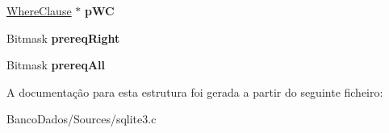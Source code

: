 \begin{DoxyCompactItemize}
\item 
\hypertarget{struct_where_term_a1fb0a9ede5a12d6d2f7886431b348fb3}{\hyperlink{struct_where_clause}{Where\-Clause} $\ast$ {\bfseries p\-W\-C}}\label{struct_where_term_a1fb0a9ede5a12d6d2f7886431b348fb3}

\item 
\hypertarget{struct_where_term_a1274011fa1ef0639284b7944f4570e67}{Bitmask {\bfseries prereq\-Right}}\label{struct_where_term_a1274011fa1ef0639284b7944f4570e67}

\item 
\hypertarget{struct_where_term_a49b700336b005067352366cfc40de07f}{Bitmask {\bfseries prereq\-All}}\label{struct_where_term_a49b700336b005067352366cfc40de07f}

\end{DoxyCompactItemize}


A documentação para esta estrutura foi gerada a partir do seguinte ficheiro\-:\begin{DoxyCompactItemize}
\item 
Banco\-Dados/\-Sources/sqlite3.\-c\end{DoxyCompactItemize}
